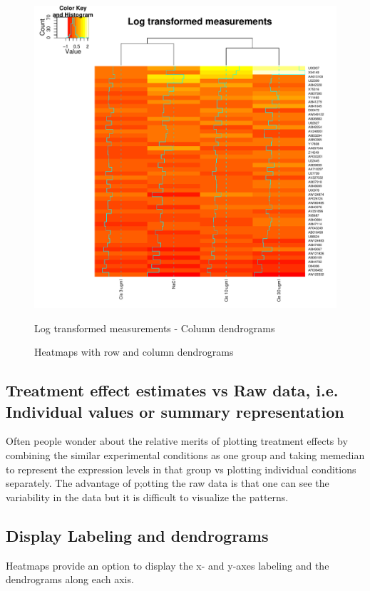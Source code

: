\documentclass[12pt, oneside, letterpaper]{article}
\begin{document}
\begin{figure}[p]
\begin{minipage}[t]{2.5in}
\begin{center}
\includegraphics[width=\textwidth]{logDataColDendrogram}
\caption{Log transformed measurements - Column dendrograms}
\label{Log transformed measurements - Column dendrograms}
\end{center}
\end{minipage}

\caption{Heatmaps with row and column dendrograms}
\end{figure}

\subsection*{Treatment effect estimates vs Raw data, i.e. Individual
	    values or summary representation} 
        Often people wonder about the relative merits of plotting
        treatment effects by combining the similar experimental
        conditions as one group and taking memedian to represent
        the expression levels in that group vs plotting individual
        conditions separately. The advantage of p;otting the raw
        data is that one can see the variability in the data but it
        is difficult to visualize the patterns.

\subsection*{Display Labeling and dendrograms}
	Heatmaps provide an option to display the x- and y-axes
labeling and the dendrograms along each axis. 
	
\end{document}
